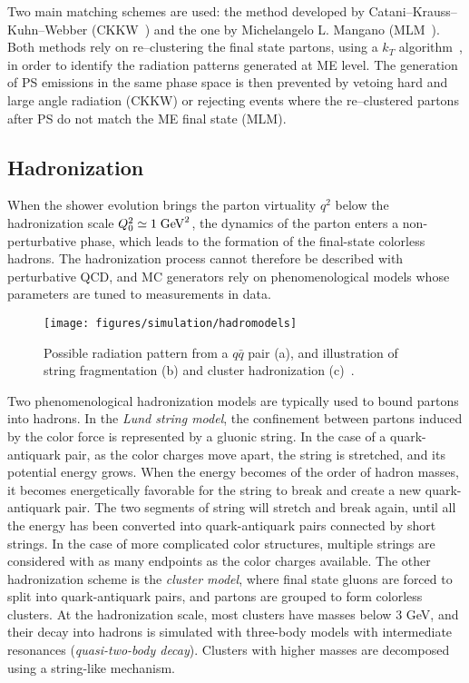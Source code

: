 Two main matching schemes are used: the method developed by
Catani--Krauss--Kuhn--Webber (CKKW~\cite{Catani:2001cc}) and the one by
Michelangelo L. Mangano (MLM~\cite{Mangano:2006rw}).
Both methods rely on re--clustering the final state partons, using a
$k_T$ algorithm~\cite{Catani:1991hj}, in order to identify the
radiation patterns generated at ME level. The generation of PS
emissions in the same phase space is then prevented by vetoing hard
and large angle radiation (CKKW) or rejecting events where the
re--clustered partons after PS do not match the ME final state (MLM).

\subsection{Hadronization}
\label{sec:hadronization}

When the shower evolution brings the parton virtuality $q^2$ below the
hadronization scale $Q_0^2\simeq1\; \mathrm{GeV}^2$, the dynamics of the parton
enters a non-perturbative phase, which leads to the formation of the
final-state colorless hadrons. The hadronization process cannot
therefore be described with perturbative QCD, and MC generators rely on
phenomenological models whose parameters are tuned to measurements in
data.

\begin{figure}[ht]
  \begin{center}
    \texttt{[image: figures/simulation/hadromodels]}
    \caption[Hadronization models]{
      Possible radiation pattern from a $q\bar{q}$ pair (a), and
      illustration of string fragmentation (b) and cluster
      hadronization (c)~\cite{mangano2005}.}
    \label{fig:hadronization}
  \end{center}
\end{figure}

Two phenomenological hadronization models are typically used to bound
partons into hadrons.
In the {\it Lund string model}, the confinement between partons
induced by the color force is represented by a gluonic string. In the
case of a quark-antiquark pair, as the color charges move apart, the
string is stretched, and its potential energy grows. When the energy
becomes of the order of hadron masses, it becomes energetically
favorable for the string to break and create a new quark-antiquark
pair. The two segments of string will stretch and break again, until
all the energy has been converted into quark-antiquark pairs connected
by short strings. In the case of more complicated color structures,
multiple strings are considered with as many endpoints as the color
charges available.
The other hadronization scheme is the {\it cluster model}, where
final state gluons are forced to split into quark-antiquark pairs,
and partons are grouped to form colorless clusters.
At the hadronization scale, most clusters have masses below $3$ GeV, and
their decay into hadrons is simulated with three-body models with
intermediate resonances ({\it quasi-two-body decay}). 
Clusters with higher masses are decomposed using a string-like
mechanism.

